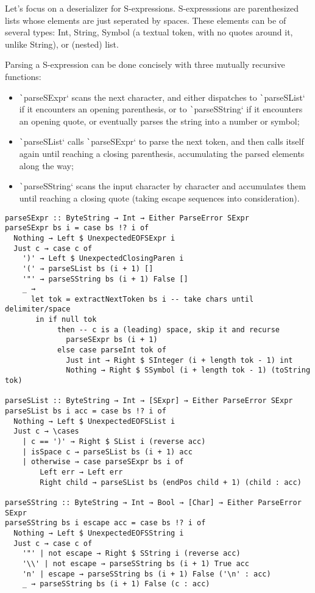 \documentclass[english]{jflart}
\begin{document}
Let's focus on a deserializer for S-expressions. S-expresssions are parenthesized lists whose elements are just seperated by spaces. These elements can be of several types: Int, String, Symbol (a textual token, with no quotes around it, unlike String), or (nested) list.

Parsing a S-expression can be done concisely with three mutually recursive functions:
\begin{itemize}
  \item \texttt`parseSExpr` scans the next character, and either dispatches to \texttt`parseSList` if it encounters an opening parenthesis, or to \texttt`parseSString` if it encounters an opening quote, or eventually parses the string into a number or symbol;
  \item \texttt`parseSList` calls \texttt`parseSExpr` to parse the next token, and then calls itself again until reaching a closing parenthesis, accumulating the parsed elements along the way;
  \item \texttt`parseSString` scans the input character by character and accumulates them until reaching a closing quote (taking escape sequences into consideration).
\end{itemize}

\begin{verbatim}
parseSExpr :: ByteString → Int → Either ParseError SExpr
parseSExpr bs i = case bs !? i of
  Nothing → Left $ UnexpectedEOFSExpr i
  Just c → case c of
    ')' → Left $ UnexpectedClosingParen i
    '(' → parseSList bs (i + 1) []
    '"' → parseSString bs (i + 1) False []
    _ →
      let tok = extractNextToken bs i -- take chars until delimiter/space
       in if null tok
            then -- c is a (leading) space, skip it and recurse
              parseSExpr bs (i + 1)
            else case parseInt tok of
              Just int → Right $ SInteger (i + length tok - 1) int
              Nothing → Right $ SSymbol (i + length tok - 1) (toString tok)

parseSList :: ByteString → Int → [SExpr] → Either ParseError SExpr
parseSList bs i acc = case bs !? i of
  Nothing → Left $ UnexpectedEOFSList i
  Just c → \cases
    | c == ')' → Right $ SList i (reverse acc)
    | isSpace c → parseSList bs (i + 1) acc
    | otherwise → case parseSExpr bs i of
        Left err → Left err
        Right child → parseSList bs (endPos child + 1) (child : acc)

parseSString :: ByteString → Int → Bool → [Char] → Either ParseError SExpr
parseSString bs i escape acc = case bs !? i of
  Nothing → Left $ UnexpectedEOFSString i
  Just c → case c of
    '"' | not escape → Right $ SString i (reverse acc)
    '\\' | not escape → parseSString bs (i + 1) True acc
    'n' | escape → parseSString bs (i + 1) False ('\n' : acc)
    _ → parseSString bs (i + 1) False (c : acc)
\end{verbatim}
\end{document}
